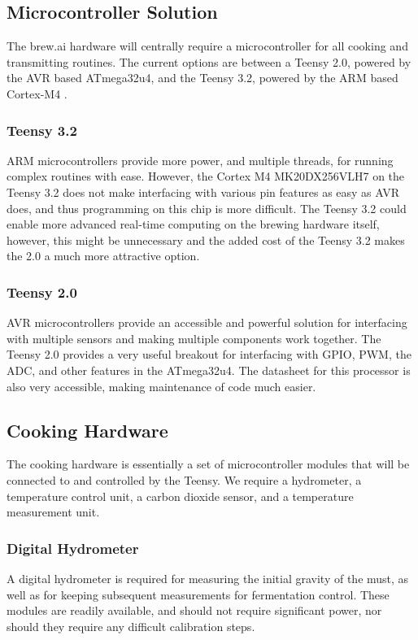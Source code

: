 \subsection{Microcontroller Solution}
The brew.ai hardware will centrally require a microcontroller for all cooking and transmitting routines.
The current options are between a Teensy 2.0, powered by the AVR based ATmega32u4, and the Teensy 3.2, powered by the ARM based Cortex-M4 \cite{teensy}. 
\subsubsection{Teensy 3.2}
ARM microcontrollers provide more power, and multiple threads, for running complex routines with ease.
However, the Cortex M4 MK20DX256VLH7 \cite{datasheet} on the Teensy 3.2 does not make interfacing with various pin features as easy as AVR does, and thus 
programming on this chip is more difficult.
The Teensy 3.2 could enable more advanced real-time computing on the brewing hardware itself, however, this might be unnecessary and the added cost of the
	Teensy 3.2 makes the 2.0 a much more attractive option.
\subsubsection{Teensy 2.0}
AVR microcontrollers provide an accessible and powerful solution for interfacing with multiple sensors and making multiple components work together.
The Teensy 2.0 provides a very useful breakout for interfacing with GPIO, PWM, the ADC, and other features in the ATmega32u4.
The datasheet for this processor is also very accessible, making maintenance of code much easier.

\subsection{Cooking Hardware}
The cooking hardware is essentially a set of microcontroller modules that will be connected to and controlled by the Teensy.
We require a hydrometer, a temperature control unit, a carbon dioxide sensor, and a temperature measurement unit.
\subsubsection{Digital Hydrometer}
A digital hydrometer is required for measuring the initial gravity of the must, as well as for keeping subsequent measurements for fermentation control.
These modules are readily available, and should not require significant power, nor should they require any difficult calibration steps.

